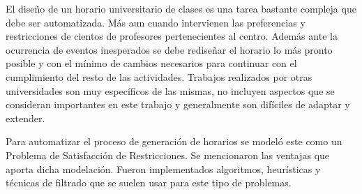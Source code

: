 \begin{conclusions}

El diseño de un horario universitario de clases es una tarea bastante compleja que debe ser automatizada. M\'as aun cuando intervienen las preferencias y restricciones de cientos de profesores pertenecientes al centro. Adem\'as ante la ocurrencia de eventos inesperados se debe rediseñar el horario lo m\'as pronto posible y con el m\'inimo de cambios necesarios para continuar con el cumplimiento del resto de las actividades. Trabajos realizados por otras universidades son muy espec\'ificos de las mismas, no incluyen aspectos que se consideran importantes en este trabajo y generalmente son dif\'iciles de adaptar y extender.

Para automatizar el proceso de generaci\'on de horarios se model\'o este como un Problema de Satisfacci\'on de Restricciones. Se mencionaron las ventajas que aporta dicha modelaci\'on. Fueron implementados algoritmos, heur\'isticas y t\'ecnicas de filtrado que se suelen usar para este tipo de problemas.

\end{conclusions}